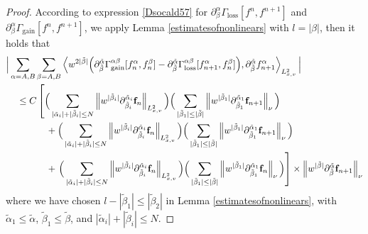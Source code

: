 \documentclass[reqno]{amsart}
\numberwithin{equation}{section}
\numberwithin{equation}{section}
\begin{document}
\begin{proof}
		According to expression \eqref{Dsocald57} for \(\partial^\alpha_\beta \Gamma_{\text{loss}}[f^n, f^{n+1}]\) and \(\partial^\alpha_\beta \Gamma_{\text{gain}}[f^n, f^{n+1}]\), we apply Lemma \ref{estimatesofnonlinears} with \(l = |\beta|\), then it holds that
		\begin{align*}
			&\Big|\sum_{\alpha=A,B}\sum_{\beta=A,B}\left\langle w^{2|\tilde{\beta}|}\Big( \partial_{\tilde{\beta}}^{\tilde{\alpha}}\Gamma^{\alpha\beta}_{\text{gain}}[f_n^{\alpha}, f_n^{\beta}] - \partial_{\tilde{\beta}}^{\tilde{\alpha}}\Gamma^{\alpha\beta}_{\text{loss}}[f_{n+1}^{\alpha}, f_{n}^{\beta}]\Big), \partial_{\tilde{\beta}}^{\tilde{\alpha}} f^{\alpha}_{n+1}\right\rangle_{L^{2}_{x,v}}\Big| \\
			&\hspace{0.4cm}\le C\left[\Big(\sum_{| \tilde{\alpha}_i |+| \tilde{\beta}_i | \leq N} \left\| w^{| \tilde{\beta}_i |} \partial_{\tilde{\beta}_i}^{\tilde{\alpha}_i} \mathbf{f}_{n}\right\|_{L^{2}_{x,v}}\Big)\Big(\sum_{| \tilde{\beta}_1 | \leq | \tilde{\beta} |} \left\| w^{| \tilde{\beta}_1 |} \partial_{\tilde{\beta}_1}^{\tilde{\alpha}_1} \mathbf{f}_{n+1}\right\|_{\nu}\Big)\right. \\
			&\hspace{1.5cm} + \Big(\sum_{| \tilde{\alpha}_i |+| \tilde{\beta}_i | \leq N} \left\| w^{| \tilde{\beta}_i |} \partial_{\tilde{\beta}_i}^{\tilde{\alpha}_i} \mathbf{f}_{n}\right\|_{L^{2}_{x,v}}\Big)\Big(\sum_{| \tilde{\beta}_1 | \leq | \tilde{\beta} |} \left\| w^{| \tilde{\beta}_1 |} \partial_{\tilde{\beta}_1}^{\tilde{\alpha}_1} \mathbf{f}_{n+1}\right\|_{\nu}\Big) \\
			&\hspace{1.5cm} + \left.\Big(\sum_{| \tilde{\alpha}_i |+| \tilde{\beta}_i | \leq N} \left\| w^{| \tilde{\beta}_i |} \partial_{\tilde{\beta}_i}^{\tilde{\alpha}_i} \mathbf{f}_{n}\right\|_{L^{2}_{x,v}}\Big)\Big(\sum_{| \tilde{\beta}_1 | \leq | \tilde{\beta} |} \left\| w^{| \tilde{\beta}_1 |} \partial_{\tilde{\beta}_1}^{\tilde{\alpha}_1} \mathbf{f}_{n}\right\|_{\nu}\Big) \right] \times \left\|w^{ |\tilde{\beta}|}\partial_{\tilde{\beta}}^{\tilde{\alpha}} \mathbf{f}_{n+1}\right\|_{\nu}
		\end{align*}
		where we have chosen \(l - |\tilde{\beta}_1| \le |\tilde{\beta}_2|\) in Lemma \ref{estimatesofnonlinears}, with  \(\tilde{\alpha}_1 \le \tilde{\alpha}\), \(\tilde{\beta}_1 \le \tilde{\beta}\), and \(|\tilde{\alpha}_i| + |\tilde{\beta}_i| \le N\).
		

\end{proof}
\end{document}
